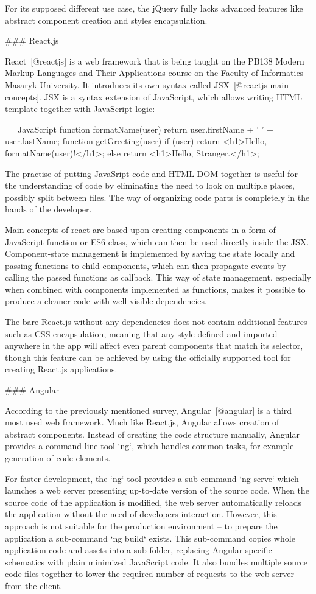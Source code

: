 \documentclass[
  digital, %
  oneside, %
  lof,     %
  lot,     %
]{fithesis4}
\begin{document}
{For its supposed different use case, the jQuery fully lacks advanced features like abstract component creation and styles encapsulation.

### React.js

React~[@reactjs] is a web framework that is being taught on the PB138 Modern Markup Languages and Their Applications course on the Faculty of Informatics Masaryk University. It introduces its own syntax called JSX~[@reactjs-main-concepts]. JSX is a syntax extension of JavaScript, which allows writing HTML template together with JavaScript logic:

~~~JavaScript
function formatName(user) {
  return user.firstName + ' ' + user.lastName;
}
function getGreeting(user) {
  if (user) return <h1>Hello, {formatName(user)}!</h1>;
  else return <h1>Hello, Stranger.</h1>;
}
~~~

The practise of putting JavaSript code and HTML DOM together is useful for the understanding of code by eliminating the need to look on multiple places, possibly split between files. The way of organizing code parts is completely in the hands of the developer.

Main concepts of react are based upon creating components in a form of JavaScript function or ES6 class, which can then be used directly inside the JSX. Component-state management is implemented by saving the state locally and passing functions to child components, which can then propagate events by calling the passed functions as callback. This way of state management, especially when combined with components implemented as functions, makes it possible to produce a cleaner code with well visible dependencies.

The bare React.js without any dependencies does not contain additional features such as CSS encapsulation, meaning that any style defined and imported anywhere in the app will affect even parent components that match its selector, though this feature can be achieved by using the officially supported tool for creating React.js applications.

### Angular

According to the previously mentioned survey, Angular~[@angular] is a third most used web framework. Much like React.js, Angular allows creation of abstract components. Instead of creating the code structure manually, Angular provides a command-line tool `ng`, which handles common tasks, for example generation of code elements.

For faster development, the `ng` tool provides a sub-command `ng serve` which launches a web server presenting up-to-date version of the source code. When the source code of the application is modified, the web server automatically reloads the application without the need of developers interaction. However, this approach is not suitable for the production environment -- to prepare the application a sub-command `ng build` exists. This sub-command copies whole application code and assets into a sub-folder, replacing Angular-specific schematics with plain minimized JavaScript code. It also bundles multiple source code files together to lower the required number of requests to the web server from the client.

}
\end{document}
